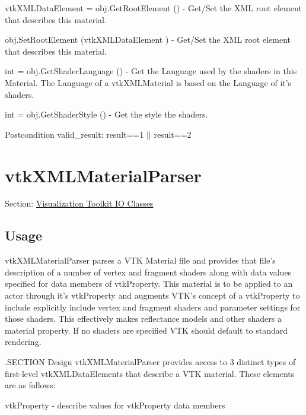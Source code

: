 \begin{DoxyItemize}
\item {\ttfamily vtk\-X\-M\-L\-Data\-Element = obj.\-Get\-Root\-Element ()} -\/ Get/\-Set the X\-M\-L root element that describes this material.  
\item {\ttfamily obj.\-Set\-Root\-Element (vtk\-X\-M\-L\-Data\-Element )} -\/ Get/\-Set the X\-M\-L root element that describes this material.  
\item {\ttfamily int = obj.\-Get\-Shader\-Language ()} -\/ Get the Language used by the shaders in this Material. The Language of a vtk\-X\-M\-L\-Material is based on the Language of it's shaders.  
\item {\ttfamily int = obj.\-Get\-Shader\-Style ()} -\/ Get the style the shaders. \begin{DoxyPostcond}{Postcondition}
valid\-\_\-result\-: result==1 $|$$|$ result==2  
\end{DoxyPostcond}

\end{DoxyItemize}\hypertarget{vtkio_vtkxmlmaterialparser}{}\section{vtk\-X\-M\-L\-Material\-Parser}\label{vtkio_vtkxmlmaterialparser}
Section\-: \hyperlink{sec_vtkio}{Visualization Toolkit I\-O Classes} \hypertarget{vtkwidgets_vtkxyplotwidget_Usage}{}\subsection{Usage}\label{vtkwidgets_vtkxyplotwidget_Usage}
vtk\-X\-M\-L\-Material\-Parser parses a V\-T\-K Material file and provides that file's description of a number of vertex and fragment shaders along with data values specified for data members of vtk\-Property. This material is to be applied to an actor through it's vtk\-Property and augments V\-T\-K's concept of a vtk\-Property to include explicitly include vertex and fragment shaders and parameter settings for those shaders. This effectively makes reflectance models and other shaders a material property. If no shaders are specified V\-T\-K should default to standard rendering.

.S\-E\-C\-T\-I\-O\-N Design vtk\-X\-M\-L\-Material\-Parser provides access to 3 distinct types of first-\/level vtk\-X\-M\-L\-Data\-Elements that describe a V\-T\-K material. These elements are as follows\-:

vtk\-Property -\/ describe values for vtk\-Property data members

